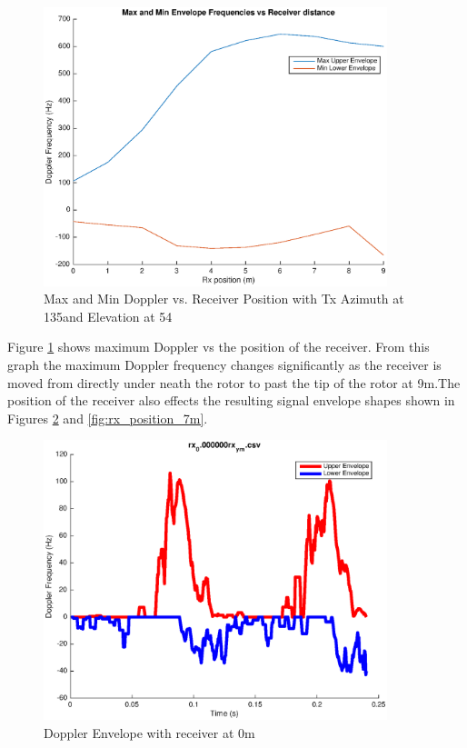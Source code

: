 \begin{figure}
	\begin{center}
		\includegraphics[width=10cm]{images/simulation/receiver_position_max_doppler.eps}
		\caption{Max and Min Doppler vs. Receiver Position with Tx Azimuth at 135\textdegree \space and Elevation at 54\textdegree}
		\label{fig:rx_position}
	\end{center}
\end{figure}

Figure \ref{fig:rx_position} shows maximum Doppler vs the position of the receiver. From this graph the maximum Doppler frequency changes significantly as the receiver is moved from directly under neath the rotor to past the tip of the rotor at 9m.The position of the receiver also effects the resulting signal envelope shapes shown in Figures \ref{fig:rx_position_0m} and \ref{fig:rx_position_7m}.

\begin{figure}
	\begin{center}
		\includegraphics[width=10cm]{images/simulation/Doppler_Receiver_0m.eps}
		\caption{Doppler Envelope with receiver at 0m}
		\label{fig:rx_position_0m}
	\end{center}
\end{figure}

